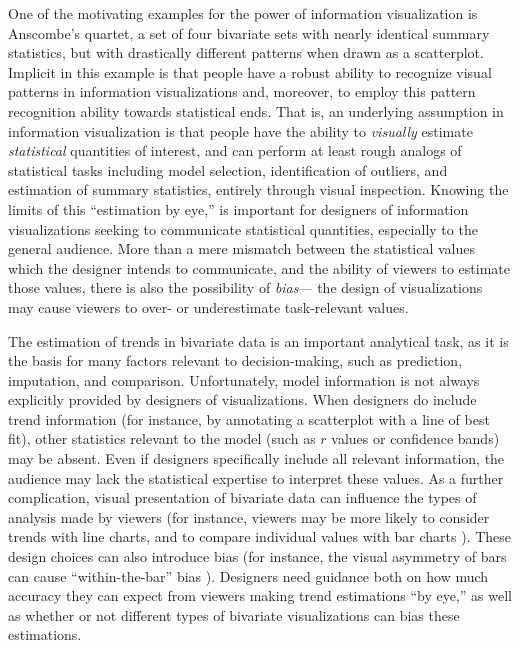 \documentclass[chi_draft]{sigchi}
\begin{document}

One of the motivating examples for the power of information visualization is Anscombe's quartet\cite{anscombe1973graphs}, a set of four bivariate sets with nearly identical summary statistics, but with drastically different patterns when drawn as a scatterplot. Implicit in this example is that people have a robust ability to recognize visual patterns in information visualizations and, moreover, to employ this pattern recognition ability towards statistical ends. That is, an underlying assumption in information visualization is that people have the ability to \emph{visually} estimate \emph{statistical} quantities of interest, and can perform at least rough analogs of statistical tasks including model selection, identification of outliers, and estimation of summary statistics, entirely through visual inspection. Knowing the limits of this ``estimation by eye,'' is important for designers of information visualizations seeking to communicate statistical quantities, especially to the general audience. More than a mere mismatch between the statistical values which the designer intends to communicate, and the ability of viewers to estimate those values, there is also the possibility of \emph{bias}--- the design of visualizations may cause viewers to over- or underestimate task-relevant values.

The estimation of trends in bivariate data is an important analytical task, as it is the basis for many factors relevant to decision-making, such as prediction, imputation, and comparison. Unfortunately, model information is not always explicitly provided by designers of visualizations. When designers do include trend information (for instance, by annotating a scatterplot with a line of best fit), other statistics relevant to the model (such as $r$ values or confidence bands) may be absent. Even if designers specifically include all relevant information, the audience may lack the statistical expertise to interpret these values. As a further complication, visual presentation of bivariate data can influence the types of analysis made by viewers (for instance, viewers may be more likely to consider trends with line charts, and to compare individual values with bar charts \cite{zacks1999bars}). These design choices can also introduce bias (for instance, the visual asymmetry of bars can cause ``within-the-bar'' bias \cite{newman2012bar}). Designers need guidance both on how much accuracy they can expect from viewers making trend estimations ``by eye,'' as well as whether or not different types of bivariate visualizations can bias these estimations.
\end{document}
